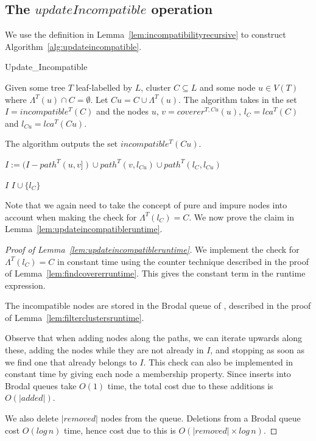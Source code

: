\documentclass{article}
\newcommand{\leafset}{\Lambda}
\begin{document}
    \subsection{The $updateIncompatible$ operation}
    \label{subsec:updateincompatible}

    We use the definition in Lemma~\ref{lem:incompatibilityrecursive} to construct Algorithm~\ref{alg:updateincompatible}.

    \begin{algorithm}
        \caption{Update\_Incompatible}
        \label{alg:updateincompatible}

        \begin{algorithmic}[1]
            \Input Given some tree $T$ leaf-labelled by $L$, cluster $C \subseteq L$ and some node $u \in V(T)$ where $\leafset^{T}(u) \cap C = \emptyset$. Let $Cu = C \cup \leafset^{T}(u)$. The algorithm takes in the set $I = incompatible^{T}(C)$ and the nodes $u$, $v = coverer^{T, Cu}(u)$, $l_C = lca^{T}(C)$ and $l_{Cu} = lca^{T}(Cu)$.

            \Output The algorithm outputs the set $incompatible^{T}(Cu)$.

            \State $I := (I - path^{T}(u, v]) \cup path^{T}(v, l_{Cu}) \cup path^{T}(l_C, l_{Cu})$

            \If{($\leafset^{T}(l_C) = C$ and $l_C$ is pure) or $l_C = l_{Cu}$}
                \State \Return $I$
            \Else
                \State \Return $I \cup \{l_C\}$
            \EndIf
        \end{algorithmic}
    \end{algorithm}

    Note that we again need to take the concept of pure and impure nodes into account when making the check for $\leafset^{T}(l_C) = C$. We now prove the claim in Lemma~\ref{lem:updateincompatibleruntime}.

    \begin{proof}[Proof of Lemma~\ref{lem:updateincompatibleruntime}]
        We implement the check for $\leafset^{T}(l_C) = C$ in constant time using the counter technique described in the proof of Lemma~\ref{lem:findcovererruntime}. This gives the constant term in the runtime expression.

        The incompatible nodes are stored in the Brodal queue of \cite{brodal1995fast}, described in the proof of Lemma~\ref{lem:filterclustersruntime}.

        Observe that when adding nodes along the paths, we can iterate upwards along these, adding the nodes while they are not already in $I$, and stopping as soon as we find one that already belongs to $I$. This check can also be implemented in constant time by giving each node a membership property. Since inserts into Brodal queues take $O(1)$ time, the total cost due to these additions is $O(|added|)$.

        We also delete $|removed|$ nodes from the queue. Deletions from a Brodal queue cost $O(log\,n)$ time, hence cost due to this is $O(|removed| \times log\,n)$.
    \end{proof}
\end{document}
